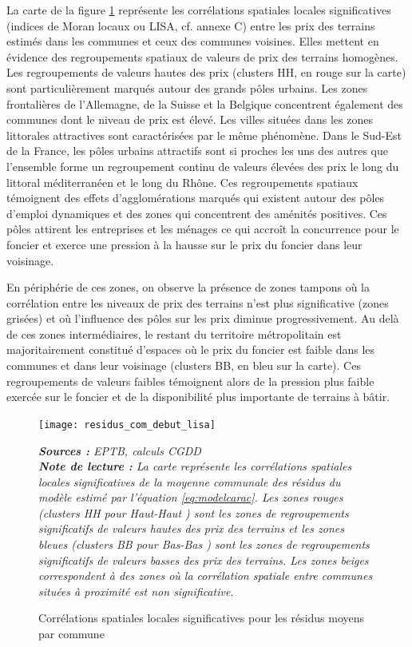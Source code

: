 \documentclass[10.5pt,a4paper]{article}
\begin{document}
{La carte de la figure \ref{prix_com_auto} représente les corrélations spatiales locales significatives (indices de Moran locaux ou LISA, cf. annexe C) entre les prix des terrains estimés dans les communes et ceux des communes voisines. Elles mettent en évidence des regroupements spatiaux de valeurs de prix des terrains homogènes. Les regroupements de valeurs hautes des prix (clusters HH, en rouge sur la carte) sont particulièrement marqués autour des grands pôles urbains. Les zones frontalières de l'Allemagne, de la Suisse et la Belgique concentrent également des communes dont le niveau de prix est élevé. Les villes situées dans les zones littorales attractives sont caractérisées par le même phénomène. Dans le Sud-Est de la France, les pôles urbains attractifs sont si proches les uns des autres que l'ensemble forme un regroupement continu de valeurs élevées des prix le long du littoral méditerranéen et le long du Rhône. Ces regroupements spatiaux témoignent des effets d'agglomérations marqués qui existent autour des pôles d'emploi dynamiques et des zones qui concentrent des aménités positives. Ces pôles attirent les entreprises et les ménages ce qui accroît la concurrence pour le foncier et exerce une pression à la hausse sur le prix du foncier dans leur voisinage.\par   

En périphérie de ces zones, on observe la présence de zones tampons où la corrélation entre les niveaux de prix des terrains n'est plus significative (zones grisées) et où l'influence des pôles sur les prix diminue progressivement. Au delà de ces zones intermédiaires, le restant du territoire métropolitain est majoritairement constitué d'espaces où le prix du foncier est faible dans les communes et dans leur voisinage (clusters BB, en bleu sur la carte). Ces regroupements de valeurs faibles témoignent alors de la pression plus faible exercée sur le foncier et de la disponibilité plus importante de terrains à bâtir. \par  


\begin{figure}[!h]%
\caption{Corrélations spatiales locales significatives pour les résidus moyens par commune}%
\texttt{[image: residus\_com\_debut\_lisa]}%

\scriptsize\textit{\textbf{Sources :} EPTB, calculs CGDD \\
\textbf{Note de lecture :} La carte représente les corrélations spatiales locales significatives de la moyenne communale des résidus du modèle estimé par l'équation \ref{eq:modelcarac}.  Les zones rouges (clusters HH pour \og Haut-Haut \fg) sont les zones de regroupements significatifs de valeurs hautes des prix des terrains et les zones bleues (clusters BB pour \fg Bas-Bas \fg) sont les zones de regroupements significatifs de valeurs basses des prix des terrains. Les zones beiges correspondent à des zones où la corrélation spatiale entre communes situées à proximité est non significative.}
\label{prix_com_auto}%
\end{figure}

}
\end{document}
